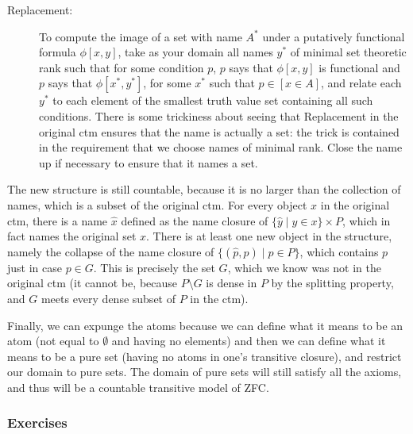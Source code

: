 \documentclass[12pt]{book}
\begin{document}
\begin{description}
\item[Replacement:]  To compute the image of a set with name $A^*$ under a putatively functional formula $\phi[x,y]$, take as your domain all names
$y^*$ of minimal set theoretic rank such that for some condition $p$, $p$ says that $\phi[x,y]$ is functional and $p$ says that $\phi[x^*,y^*]$, for some $x^*$ such that $p \in [x \in A]$, and relate each $y^*$ to each element of the smallest truth value set containing all such conditions.  There is some trickiness about seeing that Replacement in the original ctm ensures that the name is actually a set:  the trick is contained in the requirement that we choose names of minimal rank.  Close the name up if necessary to ensure that it names a set.

\end{description}

The new structure is still countable, because it is no larger than the collection of names, which is a subset of the original ctm.  For every object
$x$ in the original ctm, there is a name $\hat{x}$ defined as the name closure of $\{\hat{y}\mid y \in x\} \times P$, which in fact names the original set $x$.  There is at least one
new object in the structure, namely the collapse of the name closure of $\{(\hat{p},p)\mid p \in P\}$, which contains $p$ just in case $p \in G$.  This is precisely the set $G$, which we know was not in the original ctm (it cannot be, because $P \setminus G$ is dense in $P$ by the splitting property, and $G$ meets every dense subset of $P$ in the ctm).

Finally, we can expunge the atoms because we can define what it means to be an atom (not equal to $\emptyset$ and having no elements)
and then we can define what it means to be a pure set (having no atoms in one's transitive closure), and restrict our domain to pure sets.
The domain of pure sets will still satisfy all the axioms, and thus will be a countable transitive model of ZFC.

\subsubsection{Exercises}
\end{document}
